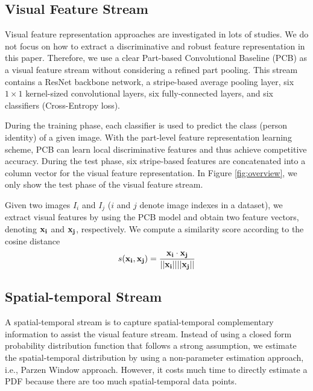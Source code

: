 \documentclass[letterpaper]{article} %
\begin{document}
\subsection{Visual Feature Stream}
Visual feature representation approaches are investigated in lots of studies. We do not focus on how to extract a discriminative and robust feature representation in this paper. Therefore, we use a clear Part-based Convolutional Baseline (PCB) \cite{Yifan2017arxiv} as a visual feature stream without considering a refined part pooling. This stream contains a ResNet backbone network, a stripe-based average pooling layer, six $1\times 1$ kernel-sized convolutional layers, six fully-connected layers, and six classifiers (Cross-Entropy loss).

During the training phase, each classifier is used to predict the class (person identity) of a given image. With the part-level feature representation learning scheme, PCB can learn local discriminative features and thus achieve competitive accuracy. During the test phase, six stripe-based features are concatenated into a column vector for the visual feature representation. In Figure \ref{fig:overview}, we only show the test phase of the visual feature stream.

Given two images $I_i$ and $I_j$ ($i$ and $j$ denote image indexes in a dataset), we extract visual features by using the PCB model and obtain two feature vectors, denoting $\bf{x_i}$ and $\bf{x_j}$, respectively. We compute a similarity score according to the cosine distance
\begin{equation}
    \label{eq:cosine}
    s({\bf{x_i}},{\bf{x_j}}) = \frac{{{\bf{x_i}} \cdot {\bf{x_j}}}}{{||{\bf{x_i}}||||{\bf{x_j}}{\rm{||}}}}
\end{equation}
\subsection{Spatial-temporal Stream}
A spatial-temporal stream is to capture spatial-temporal complementary information to assist the visual feature stream. Instead of using a closed form probability distribution function \cite{huang2016mmm} that follows a strong assumption, we estimate the spatial-temporal distribution by using a non-parameter estimation approach, i.e., Parzen Window approach. However, it costs much time to directly estimate a PDF because there are too much spatial-temporal data points.
\end{document}
